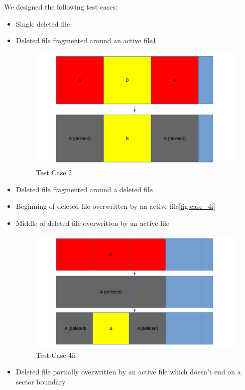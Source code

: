 We designed the following test cases:
\begin{itemize}
    \item [1] Single deleted file
    \item [2] Deleted file fragmented around an active file\ref{fig:case_2}
    \begin{figure}[h]
        \centering
        \includegraphics[width=\linewidth]{fig/case2.png}
        \caption{Test Case 2}
        \label{fig:case_2}
    \end{figure}
    \item [3] Deleted file fragmented around a deleted file
    \item [4i] Beginning of deleted file overwritten by an active file\ref{fig:case_4i}
    \item [4ii] Middle of deleted file overwritten by an active file
        \begin{figure}[h]
        \centering
        \includegraphics[width=\linewidth]{fig/case4ii.png}
        \caption{Test Case 4ii}
        \label{fig:case_4ii}
    \end{figure}
    \item [4iii] Deleted file partially overwritten by an active file which doesn't end on a sector boundary

\end{itemize}
